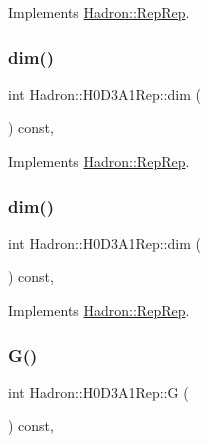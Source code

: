 Implements \mbox{\hyperlink{structHadron_1_1RepRep_a92c8802e5ed7afd7da43ccfd5b7cd92b}{Hadron\+::\+Rep\+Rep}}.

\mbox{\label{structHadron_1_1H0D3A1Rep_a783881d78557d5c845c79916a6367241}} 
\subsubsection{\texorpdfstring{dim()}{dim()}\hspace{0.1cm}{\footnotesize\ttfamily [2/3]}}
{\footnotesize\ttfamily int Hadron\+::\+H0\+D3\+A1\+Rep\+::dim (\begin{DoxyParamCaption}{ }\end{DoxyParamCaption}) const\hspace{0.3cm}{\ttfamily [inline]}, {\ttfamily [virtual]}}



Implements \mbox{\hyperlink{structHadron_1_1RepRep_a92c8802e5ed7afd7da43ccfd5b7cd92b}{Hadron\+::\+Rep\+Rep}}.

\mbox{\label{structHadron_1_1H0D3A1Rep_a783881d78557d5c845c79916a6367241}} 
\subsubsection{\texorpdfstring{dim()}{dim()}\hspace{0.1cm}{\footnotesize\ttfamily [3/3]}}
{\footnotesize\ttfamily int Hadron\+::\+H0\+D3\+A1\+Rep\+::dim (\begin{DoxyParamCaption}{ }\end{DoxyParamCaption}) const\hspace{0.3cm}{\ttfamily [inline]}, {\ttfamily [virtual]}}



Implements \mbox{\hyperlink{structHadron_1_1RepRep_a92c8802e5ed7afd7da43ccfd5b7cd92b}{Hadron\+::\+Rep\+Rep}}.

\mbox{\label{structHadron_1_1H0D3A1Rep_a654d6957eca34719885b77918fb3ea4d}} 
\subsubsection{\texorpdfstring{G()}{G()}\hspace{0.1cm}{\footnotesize\ttfamily [1/2]}}
{\footnotesize\ttfamily int Hadron\+::\+H0\+D3\+A1\+Rep\+::G (\begin{DoxyParamCaption}{ }\end{DoxyParamCaption}) const\hspace{0.3cm}{\ttfamily [inline]}, {\ttfamily [virtual]}}

